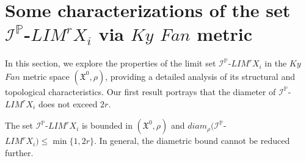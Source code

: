 \documentclass[reqno]{amsart}
\begin{document}
	\section{Some characterizations of the set $\mathcal{I}^{\mathbb{P}}$-$LIM^rX_i$ via $Ky$ $Fan$ metric}\label{secti2}
In this section, we explore the properties of the limit set $\mathcal{I}^{\mathbb{P}}$-$LIM^rX_i$ in the $Ky$ $Fan$ metric space $(\mathfrak{X^0},\rho)$, providing a detailed analysis of its structural and topological characteristics. Our first result portrays that the diameter of $\mathcal{I}^{\mathbb{P}}$-$LIM^rX_i$ does not exceed $2r$. 
\begin{theorem}
The set $\mathcal{I}^{\mathbb{P}}$-$LIM^rX_i$ is bounded in $(\mathfrak{X^0},\rho)$ and $diam_{\rho}(\mathcal{I}^{\mathbb{P}}$-$LIM^rX_i)\leq \min\{1,2r\}$. In general, the diametric bound cannot be reduced further.
\end{theorem}
\end{document}

